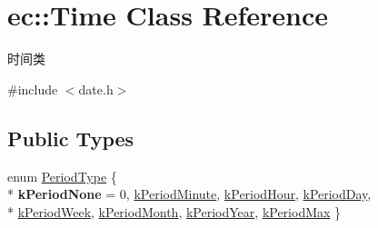 \hypertarget{classec_1_1Time}{\section{ec\-:\-:Time Class Reference}
\label{classec_1_1Time}
}


时间类  




{\ttfamily \#include $<$date.\-h$>$}

\subsection*{Public Types}
\begin{DoxyCompactItemize}
\item 
enum \hyperlink{classec_1_1Time_a5a62816a9c7f2df3ca66f54d1544ea46}{Period\-Type} \{ \\*
{\bfseries k\-Period\-None} = 0, 
\hyperlink{classec_1_1Time_a5a62816a9c7f2df3ca66f54d1544ea46a3077b99141eef7503633f22c0424bc8d}{k\-Period\-Minute}, 
\hyperlink{classec_1_1Time_a5a62816a9c7f2df3ca66f54d1544ea46a9f3a401b1323abb49064aeff0e106b12}{k\-Period\-Hour}, 
\hyperlink{classec_1_1Time_a5a62816a9c7f2df3ca66f54d1544ea46a9a5100abd3e34402f2ee8bb574ce6372}{k\-Period\-Day}, 
\\*
\hyperlink{classec_1_1Time_a5a62816a9c7f2df3ca66f54d1544ea46a54ad8e4b3e752368ee49fb1914d92822}{k\-Period\-Week}, 
\hyperlink{classec_1_1Time_a5a62816a9c7f2df3ca66f54d1544ea46a9ece0fd6329295af0cdc2cc292f07d6d}{k\-Period\-Month}, 
\hyperlink{classec_1_1Time_a5a62816a9c7f2df3ca66f54d1544ea46a7707ba1e8c424e40a551a48fdc1c3287}{k\-Period\-Year}, 
\hyperlink{classec_1_1Time_a5a62816a9c7f2df3ca66f54d1544ea46ac8bc99ab6b38d8deb3bba6353ba157ef}{k\-Period\-Max}
 \}
\end{DoxyCompactItemize}
